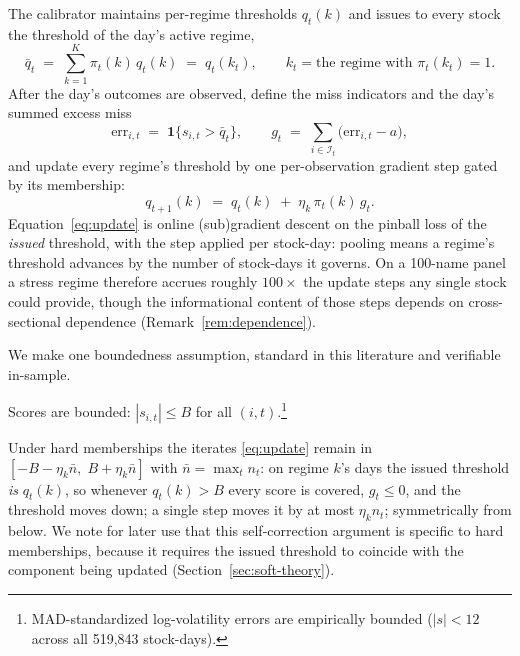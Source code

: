The calibrator maintains per-regime thresholds $q_t(k)$ and issues to every
stock the threshold of the day's active regime,
\begin{equation}\label{eq:issued}
  \bar q_t \;=\; \sum_{k=1}^{K} \pi_t(k)\, q_t(k)
  \;=\; q_t(k_t), \qquad k_t = \text{the regime with } \pi_t(k_t) = 1 .
\end{equation}
After the day's outcomes are observed, define the miss indicators and the
day's summed excess miss
\begin{equation}\label{eq:err}
  \mathrm{err}_{i,t} \;=\; \mathbf{1}\{ s_{i,t} > \bar q_t \},
  \qquad
  g_t \;=\; \sum_{i \in \mathcal{I}_t} \bigl( \mathrm{err}_{i,t} - a \bigr),
\end{equation}
and update every regime's threshold by one per-observation gradient step
gated by its membership:
\begin{equation}\label{eq:update}
  q_{t+1}(k) \;=\; q_t(k) \;+\; \eta_k\, \pi_t(k)\, g_t .
\end{equation}
Equation~\eqref{eq:update} is online (sub)gradient descent on the pinball
loss of the \emph{issued} threshold, with the step applied per stock-day:
pooling means a regime's threshold advances by the number of stock-days it
governs. On a 100-name panel a stress regime therefore accrues roughly
$100\times$ the update steps any single stock could provide, though the
informational content of those steps depends on cross-sectional dependence
(Remark~\ref{rem:dependence}).

We make one boundedness assumption, standard in this literature and
verifiable in-sample.

\begin{assumption}\label{ass:bounded}
Scores are bounded: $|s_{i,t}| \le B$ for all $(i,t)$.\footnote{
MAD-standardized log-volatility errors are empirically bounded ($|s| < 12$
across all 519{,}843 stock-days).}
\end{assumption}

Under hard memberships the iterates \eqref{eq:update} remain in
$[-B - \eta_k \bar n,\; B + \eta_k \bar n]$ with $\bar n = \max_t n_t$: on
regime $k$'s days the issued threshold \emph{is} $q_t(k)$, so whenever
$q_t(k) > B$ every score is covered, $g_t \le 0$, and the threshold moves
down; a single step moves it by at most $\eta_k n_t$; symmetrically from
below. We note for later use that this self-correction argument is
specific to hard memberships, because it requires the issued threshold to
coincide with the component being updated
(Section~\ref{sec:soft-theory}).

